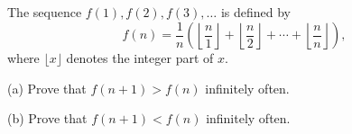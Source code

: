 The sequence $f(1), f(2), f(3), \ldots$ is defined by
\[
f(n) = \frac{1}{n}\left( \left\lfloor \frac{n}{1} \right\rfloor + \left\lfloor \frac{n}{2} \right\rfloor + \cdots + \left\lfloor \frac{n}{n} \right\rfloor \right),
\]
where $\lfloor x \rfloor$ denotes the integer part of $x$.

(a) Prove that $f(n+1) > f(n)$ infinitely often.

(b) Prove that $f(n+1) < f(n)$ infinitely often.

